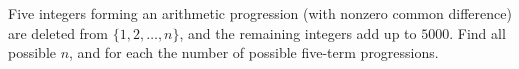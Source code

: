 Five integers forming an arithmetic progression (with nonzero common difference) are deleted from $\{1,2,\dots,n\}$, and the remaining integers add up to $5000$. Find all possible $n$, and for each the number of possible five-term progressions.
